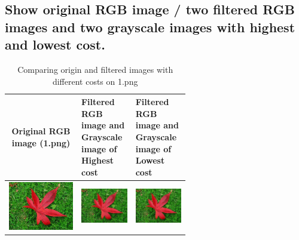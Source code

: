 \documentclass[a4paper, 12pt]{article}
\begin{document}
\subsection{Show original RGB image / two filtered RGB images and two grayscale images with highest and lowest cost.}
\begin{table}[!htb]
    \centering
    \caption{Comparing origin and filtered images with different costs on 1.png}
    \begin{tabular}{|c|p{0.3\linewidth}|p{0.3\linewidth}|}
        \hline
        Original RGB image (1.png)                        & Filtered RGB image and Grayscale image of Highest cost               & Filtered RGB image and Grayscale image of Lowest cost                \\
        \hline
        \includegraphics[scale=0.4]{part2/testdata/1.png} & \includegraphics[scale=0.4]{part2/result/1_RGB_0.0_0.0_1.0_JBF.png}  & \includegraphics[scale=0.4]{part2/result/1_RGB_0.8_0.2_0.0_JBF.png}  \\

\end{tabular}
\end{table}
\end{document}

